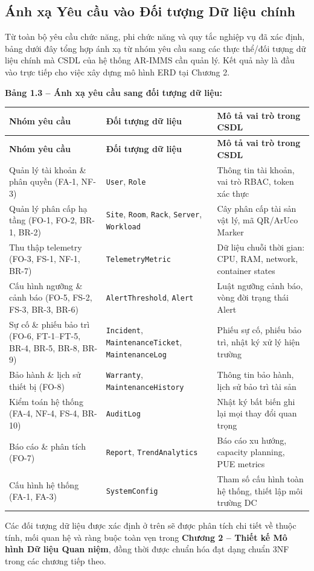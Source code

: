 \subsection{Ánh xạ Yêu cầu vào Đối tượng Dữ liệu chính}
Từ toàn bộ yêu cầu chức năng, phi chức năng và quy tắc nghiệp vụ đã xác định, bảng dưới đây tổng hợp ánh xạ từ nhóm yêu cầu sang các thực thể/đối tượng dữ liệu chính mà CSDL của hệ thống AR-IMMS cần quản lý. Kết quả này là đầu vào trực tiếp cho việc xây dựng mô hình ERD tại Chương 2.

\vspace{0.3em}
\noindent\textbf{Bảng 1.3 -- Ánh xạ yêu cầu sang đối tượng dữ liệu:}

\vspace{0.3em}
\begin{longtable}{|p{3.2cm}|p{3.8cm}|p{6.5cm}|}
\hline
\textbf{Nhóm yêu cầu} & \textbf{Đối tượng dữ liệu} & \textbf{Mô tả vai trò trong CSDL} \\
\hline
\endfirsthead
\hline
\textbf{Nhóm yêu cầu} & \textbf{Đối tượng dữ liệu} & \textbf{Mô tả vai trò trong CSDL} \\
\hline
\endhead
\hline
\endfoot
Quản lý tài khoản \& phân quyền (FA-1, NF-3) & \texttt{User}, \texttt{Role} & Thông tin tài khoản, vai trò RBAC, token xác thực \\
\hline
Quản lý phân cấp hạ tầng (FO-1, FO-2, BR-1, BR-2) & \texttt{Site}, \texttt{Room}, \texttt{Rack}, \texttt{Server}, \texttt{Workload} & Cây phân cấp tài sản vật lý, mã QR/ArUco Marker \\
\hline
Thu thập telemetry (FO-3, FS-1, NF-1, BR-7) & \texttt{TelemetryMetric} & Dữ liệu chuỗi thời gian: CPU, RAM, network, container states \\
\hline
Cấu hình ngưỡng \& cảnh báo (FO-5, FS-2, FS-3, BR-3, BR-6) & \texttt{AlertThreshold}, \texttt{Alert} & Luật ngưỡng cảnh báo, vòng đời trạng thái Alert \\
\hline
Sự cố \& phiếu bảo trì (FO-6, FT-1--FT-5, BR-4, BR-5, BR-8, BR-9) & \texttt{Incident}, \texttt{MaintenanceTicket}, \texttt{MaintenanceLog} & Phiếu sự cố, phiếu bảo trì, nhật ký xử lý hiện trường \\
\hline
Bảo hành \& lịch sử thiết bị (FO-8) & \texttt{Warranty}, \texttt{MaintenanceHistory} & Thông tin bảo hành, lịch sử bảo trì tài sản \\
\hline
Kiểm toán hệ thống (FA-4, NF-4, FS-4, BR-10) & \texttt{AuditLog} & Nhật ký bất biến ghi lại mọi thay đổi quan trọng \\
\hline
Báo cáo \& phân tích (FO-7) & \texttt{Report}, \texttt{TrendAnalytics} & Báo cáo xu hướng, capacity planning, PUE metrics \\
\hline
Cấu hình hệ thống (FA-1, FA-3) & \texttt{SystemConfig} & Tham số cấu hình toàn hệ thống, thiết lập môi trường DC \\
\hline
\end{longtable}

\vspace{0.3em}
\noindent Các đối tượng dữ liệu được xác định ở trên sẽ được phân tích chi tiết về thuộc tính, mối quan hệ và ràng buộc toàn vẹn trong \textbf{Chương 2 -- Thiết kế Mô hình Dữ liệu Quan niệm}, đồng thời được chuẩn hóa đạt dạng chuẩn 3NF trong các chương tiếp theo.

